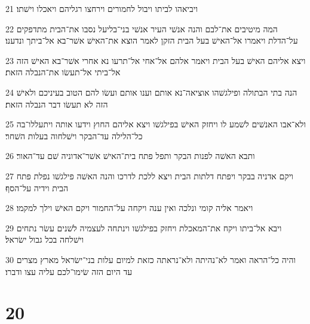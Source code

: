 \par 21 ויביאהו לביתו ויבול לחמורים וירחצו רגליהם ויאכלו וישׁתו׃
\par 22 המה מיטיבים את־לבם והנה אנשׁי העיר אנשׁי בני־בליעל נסבו את־הבית מתדפקים על־הדלת ויאמרו אל־האישׁ בעל הבית הזקן לאמר הוצא את־האישׁ אשׁר־בא אל־ביתך ונדענו׃
\par 23 ויצא אליהם האישׁ בעל הבית ויאמר אלהם אל־אחי אל־תרעו נא אחרי אשׁר־בא האישׁ הזה אל־ביתי אל־תעשׂו את־הנבלה הזאת׃
\par 24 הנה בתי הבתולה ופילגשׁהו אוציאה־נא אותם וענו אותם ועשׂו להם הטוב בעיניכם ולאישׁ הזה לא תעשׂו דבר הנבלה הזאת׃
\par 25 ולא־אבו האנשׁים לשׁמע לו ויחזק האישׁ בפילגשׁו ויצא אליהם החוץ וידעו אותה ויתעללו־בה כל־הלילה עד־הבקר וישׁלחוה בעלות השׁחר׃
\par 26 ותבא האשׁה לפנות הבקר ותפל פתח בית־האישׁ אשׁר־אדוניה שׁם עד־האור׃
\par 27 ויקם אדניה בבקר ויפתח דלתות הבית ויצא ללכת לדרכו והנה האשׁה פילגשׁו נפלת פתח הבית וידיה על־הסף׃
\par 28 ויאמר אליה קומי ונלכה ואין ענה ויקחה על־החמור ויקם האישׁ וילך למקמו׃
\par 29 ויבא אל־ביתו ויקח את־המאכלת ויחזק בפילגשׁו וינתחה לעצמיה לשׁנים עשׂר נתחים וישׁלחה בכל גבול ישׂראל׃
\par 30 והיה כל־הראה ואמר לא־נהיתה ולא־נראתה כזאת למיום עלות בני־ישׂראל מארץ מצרים עד היום הזה שׂימו־לכם עליה עצו ודברו׃

\chapter{20}

